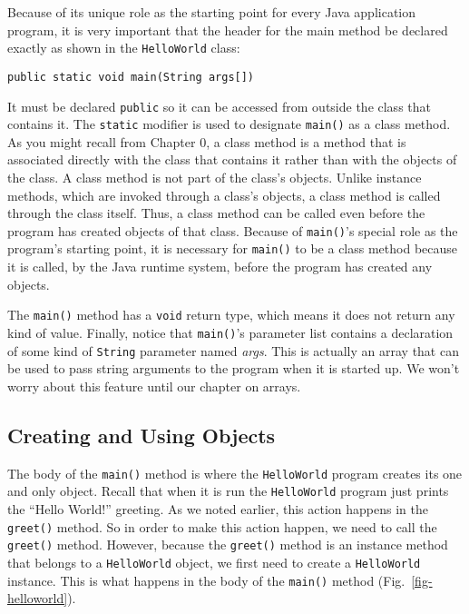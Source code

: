Because of its unique role as the starting point for every
Java application program,  it is very important that the header for
the main method be declared exactly as shown in the {\tt HelloWorld}
class:

\begin{jjjlisting}
\begin{lstlisting}
public static void main(String args[])   
\end{lstlisting}
\end{jjjlisting}

\noindent It must be declared {\tt public} so it can be accessed
from outside the class that contains it.  The {\tt static} modifier
is used to designate {\tt main()} as a class method. As you might
recall from Chapter 0, a class method is a method that is associated
directly with the class that contains it rather than with the objects
of the class. A class method is not part of the class's
objects. Unlike instance methods, which are invoked through a class's
objects, a class method is called through the class itself. Thus, a
class method can be called even before the program has created objects
of that class. Because of {\tt main()}'s special role as the program's
starting point, it is necessary for {\tt main()} to be a class method
because it is called, by the Java runtime system, before the program
has created any objects.

The {\tt main()} method has a {\tt void} return type, which means it
does not return any kind of value. Finally, notice that {\tt main()}'s
parameter list contains a declaration of some kind of {\tt String}
parameter named {\it args}. This is actually an array that can be used
to pass string arguments to the program when it is started up. We
won't worry about this feature until our chapter on arrays.

\subsection{Creating and Using Objects}

\noindent The body of the {\tt main()} method is where the 
{\tt HelloWorld} program creates its one and only object.  Recall that
when it is run the {\tt HelloWorld} program just prints the ``Hello
World!'' greeting. As we noted earlier, this action happens in the
{\tt greet()} method. So in order to make this action happen, we need
to call the {\tt greet()} method. However, because the {\tt greet()}
method is an instance method that belongs to a {\tt HelloWorld}
object, we first need to create a {\tt HelloWorld} instance. This is
what happens in the body of the {\tt main()} method
(Fig.~\ref{fig-helloworld}).

